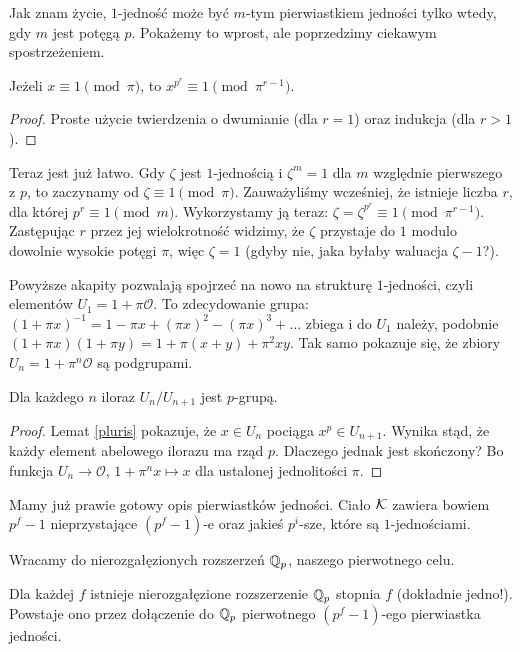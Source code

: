 Jak znam życie, $1$-jedność może być $m$-tym pierwiastkiem jedności tylko wtedy, gdy $m$ jest potęgą $p$.
Pokażemy to wprost, ale poprzedzimy ciekawym spostrzeżeniem.

\begin{lemat}\label{pluris}
	Jeżeli $x \equiv 1 \pmod \pi$, to $x^{p^r} \equiv 1 \pmod {\pi^{r-1}}$.
\end{lemat}

\begin{proof}
	Proste użycie twierdzenia o dwumianie (dla $r = 1$) oraz indukcja (dla $r >1$).
\end{proof}

Teraz jest już łatwo.
Gdy $\zeta$ jest $1$-jednością i $\zeta^m = 1$ dla $m$ względnie pierwszego z $p$, to zaczynamy od $\zeta \equiv 1 \pmod \pi$.
Zauważyliśmy wcześniej, że istnieje liczba $r$, dla której $p^r \equiv 1 \pmod m$.
Wykorzystamy ją teraz: $\zeta = \zeta^{p^r} \equiv 1 \pmod {\pi^{r-1}}$.
Zastępując $r$ przez jej wielokrotność widzimy, że $\zeta$ przystaje do $1$ modulo dowolnie wysokie potęgi $\pi$, więc $\zeta = 1$ (gdyby nie, jaka byłaby waluacja $\zeta - 1$?).

Powyższe akapity pozwalają spojrzeć na nowo na strukturę $1$-jedności, czyli elementów $U_1 = 1 + \pi \mathcal O$.
To zdecydowanie grupa: $(1+\pi x)^{-1} = 1 - \pi x + (\pi x)^2 - (\pi x)^3 + \dots$ zbiega i do $U_1$ należy, podobnie $(1+\pi x) (1+ \pi y) = 1 + \pi (x+y) + \pi^2xy$.
Tak samo pokazuje się, że zbiory $U_n = 1 + \pi^n \mathcal O$ są podgrupami.

\begin{wniosek}
	Dla każdego $n$ iloraz $U_n / U_{n+1}$ jest $p$-grupą.
\end{wniosek}

\begin{proof}
	Lemat \ref{pluris} pokazuje, że $x \in U_n$ pociąga $x^p \in U_{n+1}$.
	Wynika stąd, że każdy element abelowego ilorazu ma rząd $p$.
	Dlaczego jednak jest skończony?
	Bo funkcja $U_n \to \mathcal O$, $1 + \pi^n x \mapsto x$ dla ustalonej jednolitości $\pi$.
\end{proof}

Mamy już prawie gotowy opis pierwiastków jedności.
Ciało $\mathcal K$ zawiera bowiem $p^f-1$ nieprzystające $(p^f-1)$-e oraz jakieś $p^i$-sze, które są $1$-jednościami.

Wracamy do nierozgałęzionych rozszerzeń $\mathbb Q_p$, naszego pierwotnego celu.

\begin{fakt}
	Dla każdej $f$ istnieje nierozgałęzione rozszerzenie $\mathbb Q_p$ stopnia $f$ (dokładnie jedno!).
	Powstaje ono przez dołączenie do $\mathbb Q_p$ pierwotnego $(p^f-1)$-ego pierwiastka jedności.
\end{fakt}

